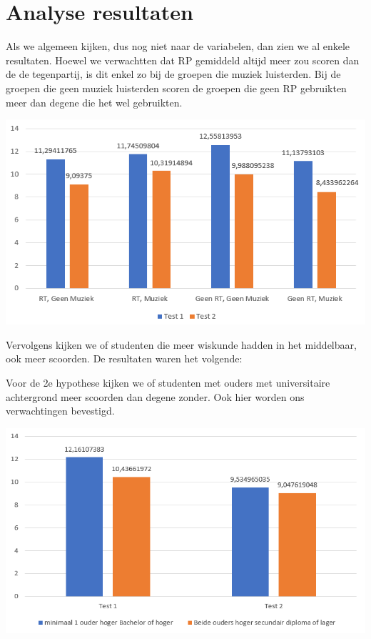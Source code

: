 \documentclass{hogent-article}
\begin{document}
	
	\section{Analyse resultaten}
	 Als we algemeen kijken, dus nog niet naar de variabelen, dan zien we al enkele resultaten. Hoewel we verwachtten dat RP gemiddeld altijd meer zou scoren dan de de tegenpartij, is dit enkel zo bij de groepen die muziek luisterden. Bij de groepen die geen muziek luisterden scoren de groepen die geen RP gebruikten meer dan degene die het wel gebruikten.
	
	\begin{minipage}[b]{2.8in}
		\centering
		\includegraphics[width=\linewidth]{img/algemeen.png}
	\end{minipage}
	
	Vervolgens kijken we of studenten die meer wiskunde hadden in het middelbaar, ook meer scoorden. De resultaten waren het volgende:
	
	Voor de 2e hypothese kijken we of studenten met ouders met universitaire achtergrond meer scoorden dan degene zonder. Ook hier worden ons verwachtingen bevestigd.
	
	\begin{minipage}[b]{2.8in}
		\centering
		\includegraphics[width=\linewidth]{img/univ.png}
	\end{minipage}
	
\end{document}
